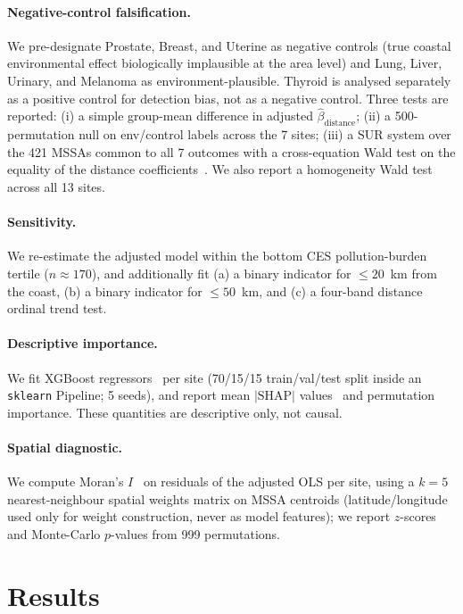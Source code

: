 \documentclass[11pt]{article}
\begin{document}
\paragraph{Negative-control falsification.}
We pre-designate Prostate, Breast, and Uterine as negative controls (true coastal environmental effect biologically implausible at the area level) and Lung, Liver, Urinary, and Melanoma as environment-plausible. Thyroid is analysed separately as a positive control for detection bias, not as a negative control. Three tests are reported: (i) a simple group-mean difference in adjusted $\hat\beta_{\text{distance}}$; (ii) a 500-permutation null on env/control labels across the 7 sites; (iii) a SUR system over the 421 MSSAs common to all 7 outcomes with a cross-equation Wald test on the equality of the distance coefficients~\citep{Zellner1962SUR}. We also report a homogeneity Wald test across all 13 sites.

\paragraph{Sensitivity.}
We re-estimate the adjusted model within the bottom CES pollution-burden tertile ($n\approx170$), and additionally fit (a) a binary indicator for $\le 20$~km from the coast, (b) a binary indicator for $\le 50$~km, and (c) a four-band distance ordinal trend test.

\paragraph{Descriptive importance.}
We fit XGBoost regressors~\citep{Chen2016XGBoost} per site (70/15/15 train/val/test split inside an \texttt{sklearn} Pipeline; 5 seeds), and report mean $|\text{SHAP}|$ values~\citep{Lundberg2017SHAP} and permutation importance. These quantities are descriptive only, not causal.

\paragraph{Spatial diagnostic.}
We compute Moran's $I$~\citep{Moran1950} on residuals of the adjusted OLS per site, using a $k{=}5$ nearest-neighbour spatial weights matrix on MSSA centroids (latitude/longitude used only for weight construction, never as model features); we report $z$-scores and Monte-Carlo $p$-values from 999 permutations.

\section{Results}
\end{document}
